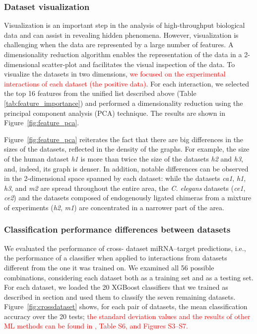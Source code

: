 \documentclass{bmcart}
\begin{document}
\subsubsection*{Dataset visualization}
Visualization is an important step in the analysis of high-throughput biological data and can assist in revealing hidden phenomena. However, visualization is challenging when the data are represented by a large number of features. A dimensionality reduction algorithm enables the representation of the data in a 2-dimensional scatter-plot and facilitates the visual inspection of the data. To visualize the datasets in two dimensions, \textcolor{red}{we focused on the experimental interactions of each dataset (the positive data)}. For each interaction, we selected the top 16 features from the unified list described above (Table \ref{tab:feature_importance}) and performed a dimensionality reduction using the principal component analysis (PCA) technique. The results are shown in Figure~\ref{fig:feature_pca}.


Figure~\ref{fig:feature_pca} reiterates the fact that there are big differences in the sizes of the datasets, reflected in the density of the graphs. For example, the size of the human dataset \textit{h1} is more than twice the size of the datasets \textit{h2} and \textit{h3}, and, indeed, its graph is denser. In addition, notable differences can be observed in the 2-dimensional space spanned by each dataset: while the datasets \textit{ca1}, \textit{h1}, \textit{h3}, and \textit{m2} are spread throughout the entire area, the \textit{C. elegans} datasets (\textit{ce1}, \textit{ce2}) and the datasets composed of endogenously ligated chimeras from a mixture of experiments (\textit{h2}, \textit{m1}) are concentrated in a narrower part of the area.

\subsubsection*{Classification performance differences between datasets}
We evaluated the performance of cross- dataset miRNA--target predictions, i.e., the performance of a classifier when applied to interactions from datasets different from the one it was trained on.
We examined all 56 possible combinations, considering each dataset both as a training set and as a testing set. 
For each dataset, we loaded the 20 XGBoost classifiers that we trained as described in section  and used them to classify the seven remaining  datasets. Figure~\ref{fig:crossdataset} shows, for each pair of datasets, the mean classification accuracy over the 20 tests; \textcolor{red}{the standard deviation values and the results of other ML methods can be found in , Table S6, and Figures S3--S7.}
\end{document}
